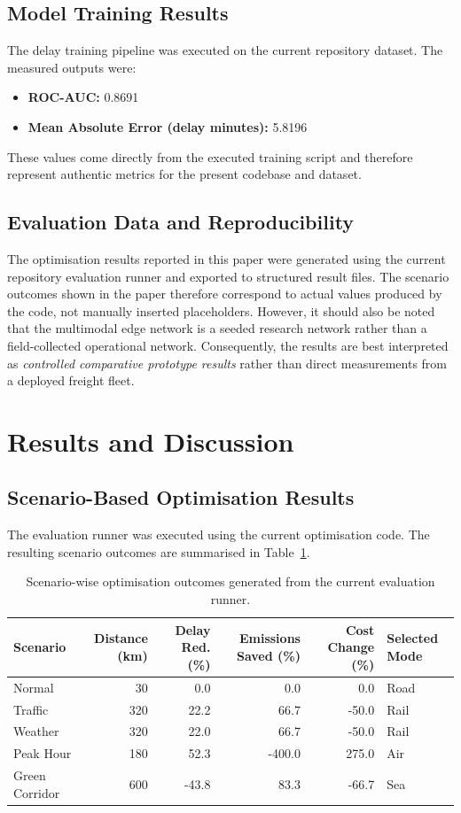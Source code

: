 \subsection{Model Training Results}
The delay training pipeline was executed on the current repository dataset. The measured outputs were:
\begin{itemize}
    \item \textbf{ROC-AUC:} 0.8691
    \item \textbf{Mean Absolute Error (delay minutes):} 5.8196
\end{itemize}

These values come directly from the executed training script and therefore represent authentic metrics for the present codebase and dataset.

\subsection{Evaluation Data and Reproducibility}
The optimisation results reported in this paper were generated using the current repository evaluation runner and exported to structured result files. The scenario outcomes shown in the paper therefore correspond to actual values produced by the code, not manually inserted placeholders. However, it should also be noted that the multimodal edge network is a seeded research network rather than a field-collected operational network. Consequently, the results are best interpreted as \textit{controlled comparative prototype results} rather than direct measurements from a deployed freight fleet.

\section{Results and Discussion}
\subsection{Scenario-Based Optimisation Results}
The evaluation runner was executed using the current optimisation code. The resulting scenario outcomes are summarised in Table~\ref{tab:scenario-results}.

\begin{table}[htbp]
\centering
\caption{Scenario-wise optimisation outcomes generated from the current evaluation runner.}
\label{tab:scenario-results}
\begin{tabular}{lrrrrl}
\toprule
Scenario & Distance (km) & Delay Red. (\%) & Emissions Saved (\%) & Cost Change (\%) & Selected Mode \\
\midrule
Normal & 30 & 0.0 & 0.0 & 0.0 & Road \\
Traffic & 320 & 22.2 & 66.7 & -50.0 & Rail \\
Weather & 320 & 22.0 & 66.7 & -50.0 & Rail \\
Peak Hour & 180 & 52.3 & -400.0 & 275.0 & Air \\
Green Corridor & 600 & -43.8 & 83.3 & -66.7 & Sea \\
\bottomrule
\end{tabular}
\end{table}

